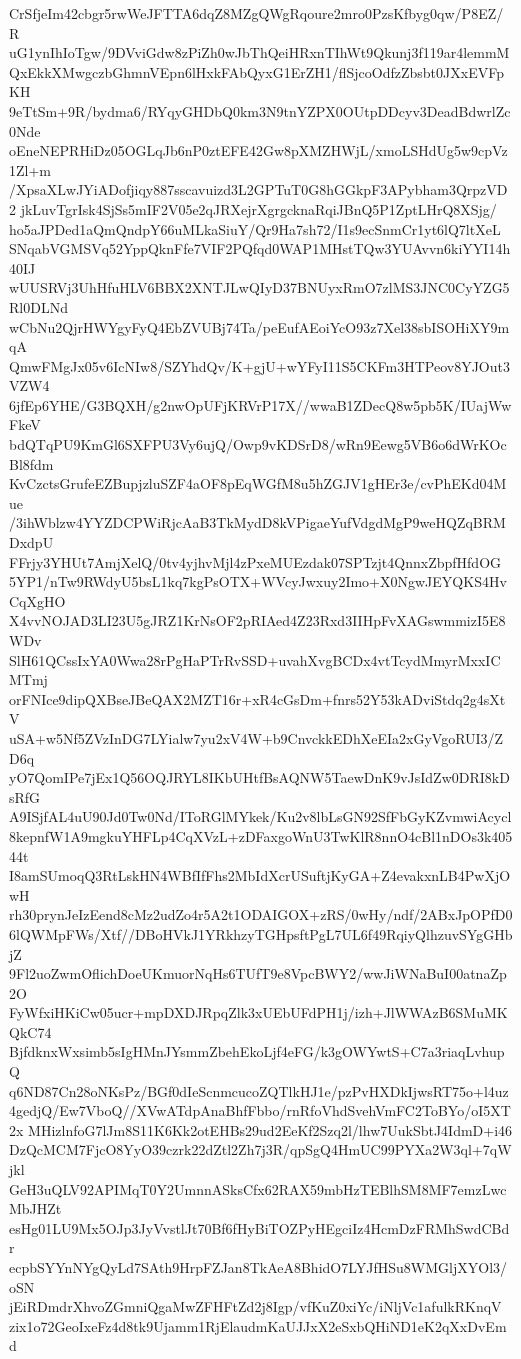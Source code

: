 CrSfjeIm42cbgr5rwWeJFTTA6dqZ8MZgQWgRqoure2mro0PzsKfbyg0qw/P8EZ/R
uG1ynIhIoTgw/9DVviGdw8zPiZh0wJbThQeiHRxnTIhWt9Qkunj3f119ar4lemmM
QxEkkXMwgczbGhmnVEpn6lHxkFAbQyxG1ErZH1/flSjcoOdfzZbsbt0JXxEVFpKH
9eTtSm+9R/bydma6/RYqyGHDbQ0km3N9tnYZPX0OUtpDDcyv3DeadBdwrlZc0Nde
oEneNEPRHiDz05OGLqJb6nP0ztEFE42Gw8pXMZHWjL/xmoLSHdUg5w9cpVz1Zl+m
/XpsaXLwJYiADofjiqy887sscavuizd3L2GPTuT0G8hGGkpF3APybham3QrpzVD2
jkLuvTgrIsk4SjSs5mIF2V05e2qJRXejrXgrgcknaRqiJBnQ5P1ZptLHrQ8XSjg/
ho5aJPDed1aQmQndpY66uMLkaSiuY/Qr9Ha7sh72/I1s9ecSnmCr1yt6lQ7ltXeL
SNqabVGMSVq52YppQknFfe7VIF2PQfqd0WAP1MHstTQw3YUAvvn6kiYYI14h40IJ
wUUSRVj3UhHfuHLV6BBX2XNTJLwQIyD37BNUyxRmO7zlMS3JNC0CyYZG5Rl0DLNd
wCbNu2QjrHWYgyFyQ4EbZVUBj74Ta/peEufAEoiYcO93z7Xel38sbISOHiXY9mqA
QmwFMgJx05v6IcNIw8/SZYhdQv/K+gjU+wYFyI11S5CKFm3HTPeov8YJOut3VZW4
6jfEp6YHE/G3BQXH/g2nwOpUFjKRVrP17X//wwaB1ZDecQ8w5pb5K/IUajWwFkeV
bdQTqPU9KmGl6SXFPU3Vy6ujQ/Owp9vKDSrD8/wRn9Eewg5VB6o6dWrKOcBl8fdm
KvCzctsGrufeEZBupjzluSZF4aOF8pEqWGfM8u5hZGJV1gHEr3e/cvPhEKd04Mue
/3ihWblzw4YYZDCPWiRjcAaB3TkMydD8kVPigaeYufVdgdMgP9weHQZqBRMDxdpU
FFrjy3YHUt7AmjXelQ/0tv4yjhvMjl4zPxeMUEzdak07SPTzjt4QnnxZbpfHfdOG
5YP1/nTw9RWdyU5bsL1kq7kgPsOTX+WVcyJwxuy2Imo+X0NgwJEYQKS4HvCqXgHO
X4vvNOJAD3LI23U5gJRZ1KrNsOF2pRIAed4Z23Rxd3IIHpFvXAGswmmizI5E8WDv
SlH61QCssIxYA0Wwa28rPgHaPTrRvSSD+uvahXvgBCDx4vtTcydMmyrMxxICMTmj
orFNIce9dipQXBseJBeQAX2MZT16r+xR4cGsDm+fnrs52Y53kADviStdq2g4sXtV
uSA+w5Nf5ZVzInDG7LYialw7yu2xV4W+b9CnvckkEDhXeEIa2xGyVgoRUI3/ZD6q
yO7QomIPe7jEx1Q56OQJRYL8IKbUHtfBsAQNW5TaewDnK9vJsIdZw0DRI8kDsRfG
A9ISjfAL4uU90Jd0Tw0Nd/IToRGlMYkek/Ku2v8lbLsGN92SfFbGyKZvmwiAcycl
8kepnfW1A9mgkuYHFLp4CqXVzL+zDFaxgoWnU3TwKlR8nnO4cBl1nDOs3k40544t
I8amSUmoqQ3RtLskHN4WBfIfFhs2MbIdXcrUSuftjKyGA+Z4evakxnLB4PwXjOwH
rh30prynJeIzEend8cMz2udZo4r5A2t1ODAIGOX+zRS/0wHy/ndf/2ABxJpOPfD0
6lQWMpFWs/Xtf//DBoHVkJ1YRkhzyTGHpsftPgL7UL6f49RqiyQlhzuvSYgGHbjZ
9Fl2uoZwmOflichDoeUKmuorNqHs6TUfT9e8VpcBWY2/wwJiWNaBuI00atnaZp2O
FyWfxiHKiCw05ucr+mpDXDJRpqZlk3xUEbUFdPH1j/izh+JlWWAzB6SMuMKQkC74
BjfdknxWxsimb5sIgHMnJYsmmZbehEkoLjf4eFG/k3gOWYwtS+C7a3riaqLvhupQ
q6ND87Cn28oNKsPz/BGf0dIeScnmcucoZQTlkHJ1e/pzPvHXDkIjwsRT75o+l4uz
4gedjQ/Ew7VboQ//XVwATdpAnaBhfFbbo/rnRfoVhdSvehVmFC2ToBYo/oI5XT2x
MHizlnfoG7lJm8S11K6Kk2otEHBs29ud2EeKf2Szq2l/lhw7UukSbtJ4IdmD+i46
DzQcMCM7FjcO8YyO39czrk22dZtl2Zh7j3R/qpSgQ4HmUC99PYXa2W3ql+7qWjkl
GeH3uQLV92APIMqT0Y2UmnnASksCfx62RAX59mbHzTEBlhSM8MF7emzLwcMbJHZt
esHg01LU9Mx5OJp3JyVvstlJt70Bf6fHyBiTOZPyHEgciIz4HcmDzFRMhSwdCBdr
ecpbSYYnNYgQyLd7SAth9HrpFZJan8TkAeA8BhidO7LYJfHSu8WMGljXYOl3/oSN
jEiRDmdrXhvoZGmniQgaMwZFHFtZd2j8Igp/vfKuZ0xiYc/iNljVc1afulkRKnqV
zix1o72GeoIxeFz4d8tk9Ujamm1RjElaudmKaUJJxX2eSxbQHiND1eK2qXxDvEmd

